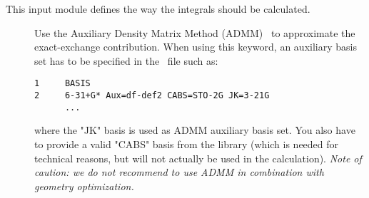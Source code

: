 This input module defines the way the integrals should be calculated.
\begin{description}

\item[] Use the Auxiliary Density Matrix Method (ADMM)~\cite{ADMM:2010} to approximate 
the exact-exchange contribution. When using this keyword, an auxiliary basis set has to be 
specified in the \mol\ file such as:
\begin{verbatim}
1     BASIS
2     6-31+G* Aux=df-def2 CABS=STO-2G JK=3-21G
      ...
\end{verbatim} 
where the "JK" basis is used as ADMM auxiliary basis set. You also have to provide a valid 
"CABS" basis from the library (which is needed for technical reasons, but will not actually 
be used in the calculation). \emph{Note of caution: we do not recommend to use ADMM in combination 
with geometry optimization.}


\end{description}
